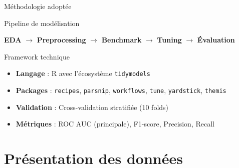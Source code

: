 \documentclass[
  10pt,
  ignorenonframetext,
  aspectratio=169,
]{beamer}
\providecommand{\tightlist}{%
  \setlength{\itemsep}{0pt}\setlength{\parskip}{0pt}}\usepackage{longtable,booktabs,array}
\begin{document}
\begin{frame}[fragile]{Méthodologie adoptée}
\label{muxe9thodologie-adoptuxe9e}
\begin{block}{Pipeline de modélisation}
\label{pipeline-de-moduxe9lisation}
\begin{center}
\textbf{EDA} $\rightarrow$ \textbf{Preprocessing} $\rightarrow$ \textbf{Benchmark} $\rightarrow$ \textbf{Tuning} $\rightarrow$ \textbf{Évaluation}
\end{center}
\end{block}

\begin{block}{Framework technique}
\label{framework-technique}
\begin{itemize}
\tightlist
\item
  \textbf{Langage} : R avec l'écosystème \texttt{tidymodels}
\item
  \textbf{Packages} : \texttt{recipes}, \texttt{parsnip},
  \texttt{workflows}, \texttt{tune}, \texttt{yardstick}, \texttt{themis}
\item
  \textbf{Validation} : Cross-validation stratifiée (10 folds)
\item
  \textbf{Métriques} : ROC AUC (principale), F1-score, Precision, Recall
\end{itemize}
\end{block}
\end{frame}

\section{Présentation des données}\label{pruxe9sentation-des-donnuxe9es}
\end{document}
